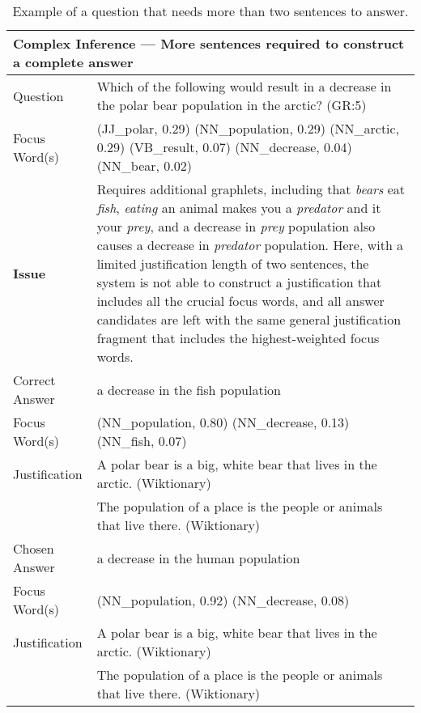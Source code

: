 \begin{table}[]
\begin{footnotesize}
\begin{tabularx}{\textwidth}{p{2.5cm}p{10cm}}
\hline
\multicolumn{2}{l}{Complex Inference --- More sentences required to construct a complete answer} \\
\hline
Question 		& Which of the following would result in a decrease in the polar bear population in the arctic? (GR:5) \\
Focus Word(s) 	& (JJ\_polar, 0.29) (NN\_population, 0.29) (NN\_arctic, 0.29) (VB\_result, 0.07) (NN\_decrease, 0.04) (NN\_bear, 0.02) \\
\textbf{Issue}	&  Requires additional graphlets, including that \emph{bears} eat \emph{fish}, \emph{eating} an animal makes you a \emph{predator} and it your \emph{prey}, and a decrease in \emph{prey} population also causes a decrease in \emph{predator} population.  Here, with a limited justification length of two sentences, the system is not able to construct a justification that includes all the crucial focus words, and all answer candidates are left with the same general justification fragment that includes the highest-weighted focus words. \\
\hline
Correct Answer 	&  a decrease in the fish population \\
Focus Word(s) 	&  (NN\_population, 0.80) (NN\_decrease, 0.13) (NN\_fish, 0.07) \\
Justification 	& A polar bear is a big, white bear that lives in the arctic. (Wiktionary)\\
 				& The population of a place is the people or animals that live there.  (Wiktionary)\\
\hline
Chosen Answer 	& a decrease in the human population \\
Focus Word(s) 	& (NN\_population, 0.92) (NN\_decrease, 0.08) \\
Justification 	& A polar bear is a big, white bear that lives in the arctic. (Wiktionary)\\
 				& The population of a place is the people or animals that live there.  (Wiktionary)\\
\hline
\end{tabularx}
\end{footnotesize}
\caption{{  Example of a question that needs more than two sentences to answer. }} 
\label{ex:longerchains}
\end{table}

